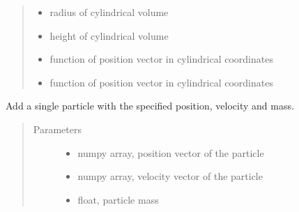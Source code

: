\documentclass[letterpaper,10pt,english]{sphinxmanual}
\begin{document}
\begin{itemize}
\begin{fulllineitems}
\begin{fulllineitems}
\begin{quote}
\begin{description}
\begin{itemize}
\item {} 
\sphinxAtStartPar
{} \textendash{} radius of cylindrical volume

\item {} 
\sphinxAtStartPar
{} \textendash{} height of cylindrical volume

\item {} 
\sphinxAtStartPar
{} \textendash{} function of position vector in cylindrical coordinates

\item {} 
\sphinxAtStartPar
{} \textendash{} function of position vector in cylindrical coordinates

\end{itemize}

\end{description}\end{quote}

\end{fulllineitems}


\begin{fulllineitems}
\label{\detokenize{space:nbody.simulator.space.Space.add_particle}}
\sphinxAtStartPar
Add a single particle with the specified position, velocity and mass.
\begin{quote}\begin{description}
\item[{Parameters}] \leavevmode\begin{itemize}
\item {} 
\sphinxAtStartPar
{} \textendash{} numpy array, position vector of the particle

\item {} 
\sphinxAtStartPar
{} \textendash{} numpy array, velocity vector of the particle

\item {} 
\sphinxAtStartPar
{} \textendash{} float, particle mass


\end{itemize}
\end{description}
\end{quote}
\end{fulllineitems}
\end{fulllineitems}
\end{itemize}
\end{document}
